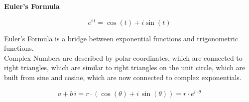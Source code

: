 \documentclass{ximera}
\begin{document}
\begin{theorem} \textbf{\textcolor{green!50!black}{Euler's Formula}}   


\[   e^{i \, t} = \cos(t) + i \sin(t)         \]


\end{theorem}




Euler's Formula is a bridge between exponential functions and trigonometric functions. \\




Complex Numbers are described by polar coordinates, which are connected to right triangles, which are similar to right triangles on the unit circle, which are built from sine and cosine, which are now connected to complex exponentials.




\begin{center}


\[
a + b \, i =  r \cdot (\cos(\theta) + i \, \sin(\theta)) = r \cdot e^{i \cdot \theta}
\]

\end{center}
\end{document}
